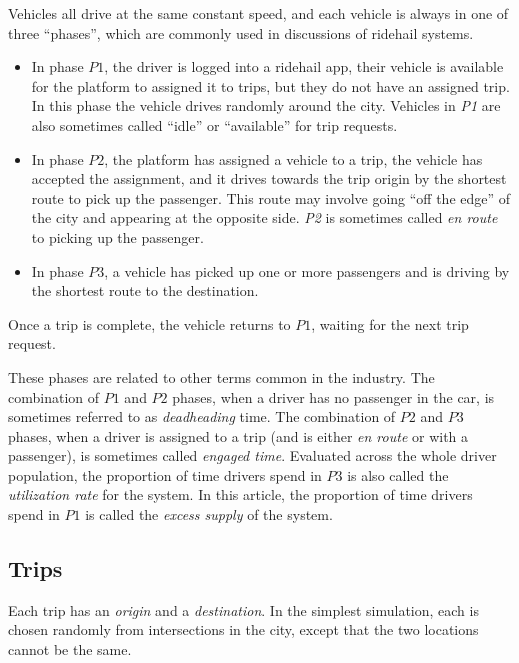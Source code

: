 \documentclass[
  letterpaper,
  DIV=11,
  numbers=noendperiod]{scrartcl}
\begin{document}
Vehicles all drive at the same constant speed, and each vehicle is
always in one of three ``phases'', which are commonly used in
discussions of ridehail systems.

\begin{itemize}
\item
  In phase \(P1\), the driver is logged into a ridehail app, their
  vehicle is available for the platform to assigned it to trips, but
  they do not have an assigned trip. In this phase the vehicle drives
  randomly around the city. Vehicles in \emph{P1} are also sometimes
  called ``idle'' or ``available'' for trip requests.
\item
  In phase \(P2\), the platform has assigned a vehicle to a trip, the
  vehicle has accepted the assignment, and it drives towards the trip
  origin by the shortest route to pick up the passenger. This route may
  involve going ``off the edge'' of the city and appearing at the
  opposite side. \emph{P2} is sometimes called \emph{en route} to
  picking up the passenger.
\item
  In phase \(P3\), a vehicle has picked up one or more passengers and is
  driving by the shortest route to the destination.
\end{itemize}

Once a trip is complete, the vehicle returns to \(P1\), waiting for the
next trip request.

These phases are related to other terms common in the industry. The
combination of \(P1\) and \(P2\) phases, when a driver has no passenger
in the car, is sometimes referred to as \emph{deadheading} time. The
combination of \(P2\) and \(P3\) phases, when a driver is assigned to a
trip (and is either \emph{en route} or with a passenger), is sometimes
called \emph{engaged time}. Evaluated across the whole driver
population, the proportion of time drivers spend in \(P3\) is also
called the \emph{utilization rate} for the system. In this article, the
proportion of time drivers spend in \(P1\) is called the \emph{excess
supply} of the system.

\hypertarget{trips}{%
\subsection{Trips}\label{trips}}

Each trip has an \emph{origin} and a \emph{destination}. In the simplest
simulation, each is chosen randomly from intersections in the city,
except that the two locations cannot be the same.
\end{document}
